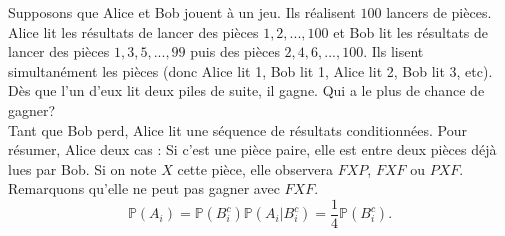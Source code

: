 \documentclass[a4paper]{article}
\newcommand*{\P}{\mathbb{P}}
\begin{document}
Supposons que Alice et Bob jouent à un jeu. Ils réalisent \(100\) lancers de pièces.
Alice lit les résultats de lancer des pièces \(1,2,...,100\) et Bob lit les résultats 
de lancer des pièces \(1,3,5,...,99\) puis des pièces \(2,4,6,...,100\). Ils lisent 
simultanément les pièces (donc Alice lit 1, Bob lit 1, Alice lit 2, Bob lit 3, etc). Dès 
que l'un d'eux lit deux piles de suite, il gagne. Qui a le plus de chance de gagner?\\

Tant que Bob perd, Alice lit une séquence de résultats conditionnées. Pour résumer, Alice
deux cas :
Si c'est une pièce paire, elle est entre deux pièces déjà lues par Bob. Si on note 
\(X\) cette pièce, elle observera \(FXP\), \(FXF\) ou \(PXF\). Remarquons qu'elle ne peut pas gagner avec \(FXF\).
\begin{equation}
    \P(A_i) = \P(B_i^c)\P(A_i|B^c_i) = \frac{1}{4}\P(B_i^c).
\end{equation}
\end{document}
